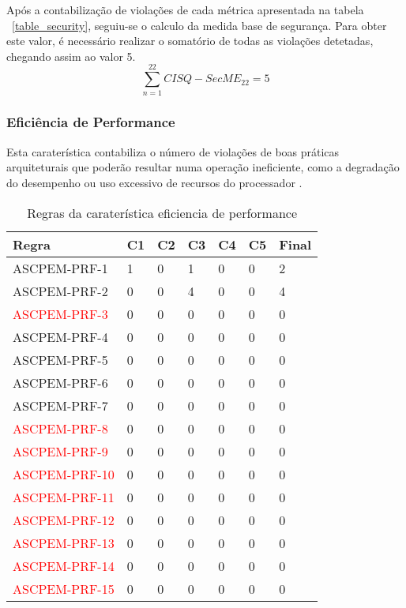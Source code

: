\documentclass[openany,10pt,a4paper]{article}
\begin{document}
Após a contabilização de violações de cada métrica apresentada na tabela ~\ref{table_security}, seguiu-se o calculo da medida base de segurança. Para obter este valor, é necessário realizar o somatório de todas as violações detetadas, chegando assim ao valor 5.
$$\sum_{n=1}^{22} CISQ - SecME_{22} = 5$$

\subsubsection{Eficiência de Performance}
Esta caraterística contabiliza o número de violações de boas práticas arquiteturais que poderão resultar numa operação ineficiente, como a degradação do desempenho ou uso excessivo de recursos do processador \cite{OMG_Performance}.
\begin{longtable}{p{1.3in}|p{0.28in}|p{0.28in}|p{0.28in}|p{0.28in}|p{0.28in}|p{0.35in}}
	\caption{Regras da caraterística eficiencia de performance}
	\label{table_performance}
	\endhead
	\hline	
	\textbf{Regra} & \textbf{C1} & \textbf{C2} & \textbf{C3} & \textbf{C4} & \textbf{C5} & \textbf{Final} \\ \hline
ASCPEM-PRF-1 & 1 & 0 & 1 & 0 & 0 & 2 \\ \hline
ASCPEM-PRF-2 & 0 & 0 & 4 & 0 & 0 & 4 \\ \hline
\textcolor{red}{ASCPEM-PRF-3} & 0 & 0 & 0 & 0 & 0 & 0 \\ \hline
ASCPEM-PRF-4 & 0 & 0 & 0 & 0 & 0 & 0 \\ \hline
ASCPEM-PRF-5 & 0 & 0 & 0 & 0 & 0 & 0 \\ \hline
ASCPEM-PRF-6 & 0 & 0 & 0 & 0 & 0 & 0 \\ \hline
ASCPEM-PRF-7 & 0 & 0 & 0 & 0 & 0 & 0 \\ \hline
\textcolor{red}{ASCPEM-PRF-8} & 0 & 0 & 0 & 0 & 0 & 0 \\ \hline
\textcolor{red}{ASCPEM-PRF-9} & 0 & 0 & 0 & 0 & 0 & 0 \\ \hline
\textcolor{red}{ASCPEM-PRF-10} & 0 & 0 & 0 & 0 & 0 & 0 \\ \hline
\textcolor{red}{ASCPEM-PRF-11} & 0 & 0 & 0 & 0 & 0 & 0 \\ \hline
\textcolor{red}{ASCPEM-PRF-12} & 0 & 0 & 0 & 0 & 0 & 0 \\ \hline
\textcolor{red}{ASCPEM-PRF-13} & 0 & 0 & 0 & 0 & 0 & 0 \\ \hline
\textcolor{red}{ASCPEM-PRF-14} & 0 & 0 & 0 & 0 & 0 & 0 \\ \hline
\textcolor{red}{ASCPEM-PRF-15} & 0 & 0 & 0 & 0 & 0 & 0 \\ \hline
	\end{longtable} 
\end{document}
